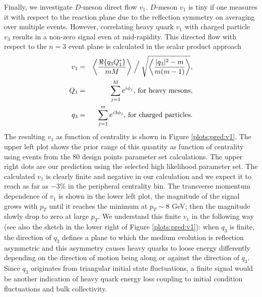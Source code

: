 Finally, we investigate $D$-meson direct flow $v_1$.
$D$-meson $v_1$ is tiny if one measures it with respect to the reaction plane due to the reflection symmetry on averaging over multiple events.
However, correlating heavy quark $v_1$ with charged particle $v_3$ results in a non-zero signal even at mid-rapidity.
This directed flow with respect to the $n=3$ event plane is calculated in the scalar product approach
\begin{eqnarray}
v_1 &=& \left\langle \frac{\Re\{q_3 Q_1^*\}}{mM} \right\rangle\Bigm/\sqrt{\left\langle \frac{|q_3|^2-m}{m(m-1)} \right\rangle}, \nonumber\\
Q_1 &=& \sum_{j=1}^{M}e^{i\phi_j} \textrm{, for heavy mesons},\nonumber\\
q_3 &=& \sum_{j=1}^{m}e^{i3\phi_j} \textrm{, for charged particles}. 
\end{eqnarray}
The resulting $v_1$ as function of centrality is shown in Figure \ref{plots:pred:v1}.
The upper left plot shows the prior range of this quantity as function of centrality using events from the 80 design points parameter set calculations.
The upper right dots are our prediction using the selected high likelihood parameter set.
The calculated $v_1$ is clearly finite and negative in our calculation and we expect it to reach as far as $-3\%$ in the peripheral centrality bin.
The transverse momentum dependence of $v_1$ is shown in the lower left plot, the magnitude of the signal grows with $p_T$ until it reaches the minimum at $p_T \sim 8$ GeV; then the magnitude slowly drop to zero at large $p_T$.
We understand this finite $v_1$ in the following way
(see also the sketch in the lower right of Figure \ref{plots:pred:v1}):
when $q_3$ is finite, the direction of $q_3$ defines a plane to which the medium evolution is reflection asymmetric and this asymmetry causes heavy quarks to loose energy differently depending on the direction of motion being along or against the direction of $q_3$.
Since $q_3$ originates from triangular initial state fluctuations, a finite signal would be another indication of heavy quark energy loss coupling to initial condition fluctuations and bulk collectivity.

